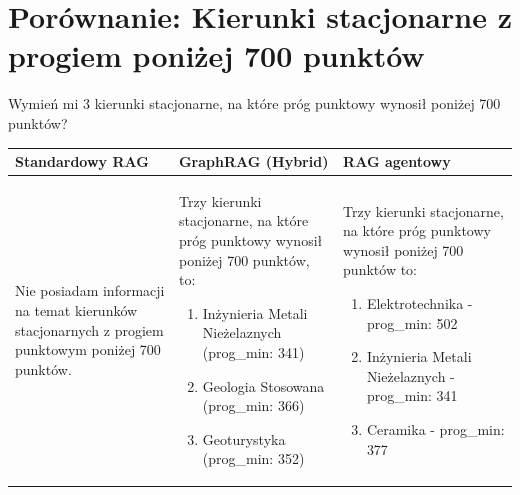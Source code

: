 \newpage
\section*{Porównanie: Kierunki stacjonarne z progiem poniżej 700 punktów}

\begin{tcolorbox}[colback=blue!5!white,colframe=blue!75!black,title=Pytanie użytkownika]
    Wymień mi 3 kierunki stacjonarne, na które próg punktowy wynosił poniżej 700 punktów?
\end{tcolorbox}

\noindent
\begin{tabularx}{\textwidth}{@{} >{\raggedright\arraybackslash}X >{\raggedright\arraybackslash}X >{\raggedright\arraybackslash}X @{}}
    \toprule
    \textbf{Standardowy RAG} & \textbf{GraphRAG (Hybrid)} & \textbf{RAG agentowy} \\
    \midrule
    \footnotesize Nie posiadam informacji na temat kierunków stacjonarnych z progiem punktowym poniżej 700 punktów. & \begin{minipage}[t]{\linewidth}\footnotesize Trzy kierunki stacjonarne, na które próg punktowy wynosił poniżej 700 punktów, to:
\begin{enumerate}
\item Inżynieria Metali Nieżelaznych (prog\_min: 341)
\item Geologia Stosowana (prog\_min: 366)
\item Geoturystyka (prog\_min: 352)
\end{enumerate}\end{minipage} & \begin{minipage}[t]{\linewidth}\footnotesize Trzy kierunki stacjonarne, na które próg punktowy wynosił poniżej 700 punktów to:
\begin{enumerate}
\item Elektrotechnika - prog\_min: 502
\item Inżynieria Metali Nieżelaznych - prog\_min: 341
\item Ceramika - prog\_min: 377
\end{enumerate}\end{minipage} \\
    \bottomrule
\end{tabularx}


